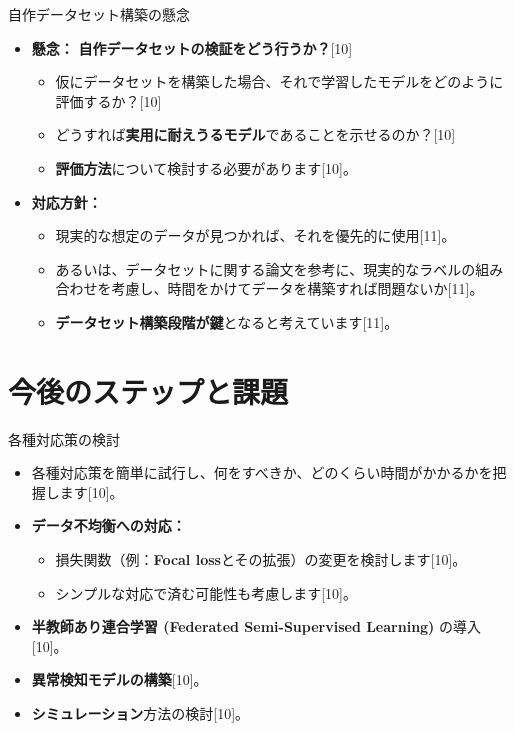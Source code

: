 \documentclass[unicode,12pt,aspectratio=169,dvipdfmx]{beamer}
\begin{document}
\begin{frame}{自作データセット構築の懸念} %
    \begin{itemize}
        \item \textbf{懸念：} \textbf{自作データセットの検証をどう行うか？}[10]
        \begin{itemize}
            \item 仮にデータセットを構築した場合、それで学習したモデルをどのように評価するか？[10]
            \item どうすれば\textbf{実用に耐えうるモデル}であることを示せるのか？[10]
            \item \textbf{評価方法}について検討する必要があります[10]。
        \end{itemize}
        \item \textbf{対応方針：}
        \begin{itemize}
            \item 現実的な想定のデータが見つかれば、それを優先的に使用[11]。
            \item あるいは、データセットに関する論文を参考に、現実的なラベルの組み合わせを考慮し、時間をかけてデータを構築すれば問題ないか[11]。
            \item \textbf{データセット構築段階が鍵}となると考えています[11]。
        \end{itemize}
    \end{itemize}
\end{frame}

\section{今後のステップと課題} %
\begin{frame}{各種対応策の検討} %
    \begin{itemize}
        \item 各種対応策を簡単に試行し、何をすべきか、どのくらい時間がかかるかを把握します[10]。
        \item \textbf{データ不均衡への対応：}
        \begin{itemize}
            \item 損失関数（例：\textbf{Focal loss}とその拡張）の変更を検討します[10]。
            \item シンプルな対応で済む可能性も考慮します[10]。
        \end{itemize}
        \item \textbf{半教師あり連合学習 (Federated Semi-Supervised Learning)} の導入[10]。
        \item \textbf{異常検知モデルの構築}[10]。
        \item \textbf{シミュレーション}方法の検討[10]。
    \end{itemize}
\end{frame}
\end{document}
